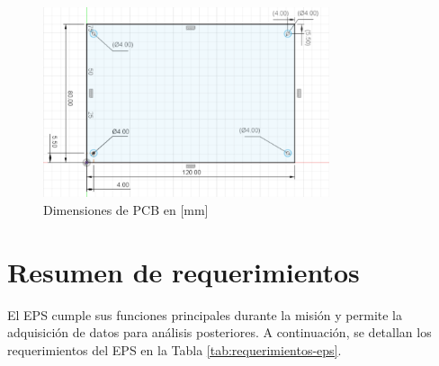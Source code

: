 \begin{figure}[hbt!]
\centering
\includegraphics[width=0.75\textwidth]{Pictures/PlanoC.png}
\caption{Dimensiones de PCB en [mm]}\label{fig:PlanoPCB}
\end{figure}

\section{Resumen de requerimientos}
\vspace{0.5 cm}

El EPS cumple sus funciones principales durante la misión y permite la adquisición de datos para análisis posteriores. A continuación, se detallan los requerimientos del EPS en la Tabla \ref{tab:requerimientos-eps}.

